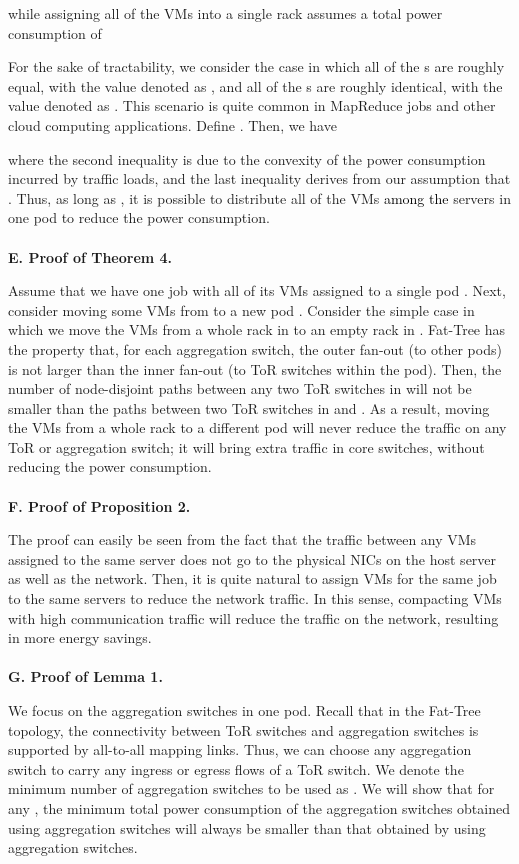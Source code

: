 \documentclass[journal,single-space,two column,twoside,10pt]{IEEEtran}
\begin{document}
while assigning all of the VMs into a single rack assumes a total power consumption of

For the sake of tractability, we consider the case in which all of the s are roughly equal, with the value denoted as , and all of the s are roughly identical, with the value denoted as . This scenario is quite common in MapReduce jobs and other cloud computing applications. Define . Then, we have

where the second inequality is due to the convexity of the power consumption incurred by traffic loads, and the last inequality derives from our assumption that . Thus, as long as , it is possible to distribute all of the VMs \textcolor{black}{among the} servers in one pod to reduce the power consumption.
\\\\
\noindent\textbf{E. Proof of Theorem 4.}

Assume that we have one job with all of its VMs assigned to a single pod . Next, consider moving some VMs from  to a new pod . Consider the simple case in which we move the VMs from a whole rack in  to an empty rack in . Fat-Tree has the property that, for each aggregation switch, the outer fan-out (to other pods) is not larger than the inner fan-out (to ToR switches within the pod). Then, the number of node-disjoint paths between any two ToR switches in  will not be smaller than the paths between two ToR switches in  and . As a result, moving the VMs from a whole rack to a different pod will never reduce the traffic on any ToR or aggregation switch; it will bring extra traffic in core switches, without reducing the power consumption.
\\\\
\noindent\textbf{F. Proof of Proposition 2.}

The proof can easily be seen from the fact that the traffic between any VMs assigned to the same server does not go to the physical NICs on the host server as well as the network. Then, it is quite natural to assign VMs for the same job to the same servers to reduce the network traffic. In this sense, compacting VMs with high communication traffic will reduce the traffic on the network, resulting in more energy savings.
\\\\
\noindent\textbf{G. Proof of Lemma 1.}

We focus on the aggregation switches in one pod. Recall that in the Fat-Tree topology, the connectivity between ToR switches and aggregation switches is supported by all-to-all mapping links. Thus, we can choose any aggregation switch to carry any ingress or egress flows of a ToR switch. We denote the minimum number of aggregation switches to be used as . We will show that for any , the minimum total power consumption of the aggregation switches obtained using  aggregation switches will always be smaller than that obtained by using  aggregation switches.
\end{document}

